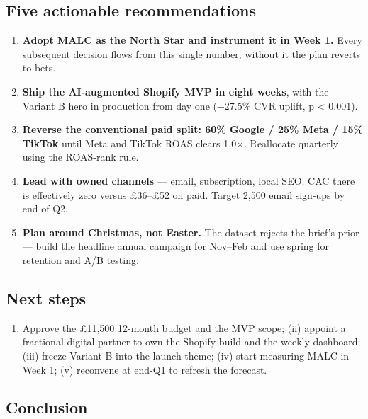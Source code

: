 \documentclass[
  11pt,
]{article}
\providecommand{\tightlist}{%
  \setlength{\itemsep}{0pt}\setlength{\parskip}{0pt}}
\begin{document}
\subsection{Five actionable
recommendations}\label{five-actionable-recommendations}

\begin{enumerate}
\def\labelenumi{\arabic{enumi}.}
\tightlist
\item
  \textbf{Adopt MALC as the North Star and instrument it in Week 1.}
  Every subsequent decision flows from this single number; without it
  the plan reverts to bets.
\item
  \textbf{Ship the AI-augmented Shopify MVP in eight weeks}, with the
  Variant B hero in production from day one (+27.5\% CVR uplift, p
  \textless{} 0.001).
\item
  \textbf{Reverse the conventional paid split: 60\% Google / 25\% Meta /
  15\% TikTok} until Meta and TikTok ROAS clears 1.0\(\times\).
  Reallocate quarterly using the ROAS-rank rule.
\item
  \textbf{Lead with owned channels} --- email, subscription, local SEO.
  CAC there is effectively zero versus £36--£52 on paid. Target 2,500
  email sign-ups by end of Q2.
\item
  \textbf{Plan around Christmas, not Easter.} The dataset rejects the
  brief's prior --- build the headline annual campaign for Nov--Feb and
  use spring for retention and A/B testing.
\end{enumerate}

\subsection{Next steps}\label{next-steps}

\begin{enumerate}
\def\labelenumi{(\roman{enumi})}
\tightlist
\item
  Approve the £11,500 12-month budget and the MVP scope; (ii) appoint a
  fractional digital partner to own the Shopify build and the weekly
  dashboard; (iii) freeze Variant B into the launch theme; (iv) start
  measuring MALC in Week 1; (v) reconvene at end-Q1 to refresh the
  forecast.
\end{enumerate}

\subsection{Conclusion}\label{conclusion}
\end{document}
